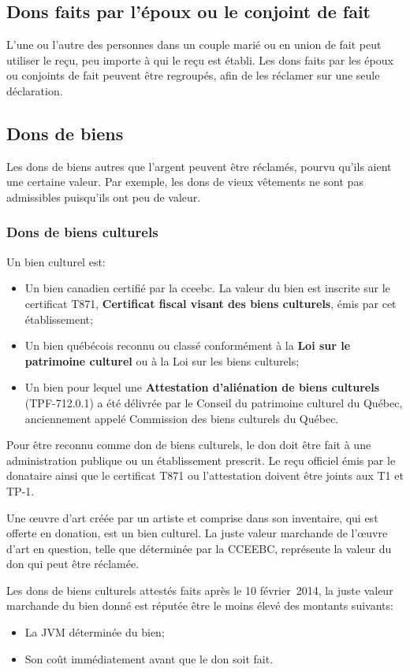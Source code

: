 \subsection{Dons faits par l'époux ou le conjoint de fait}
L'une ou l'autre des personnes dans un couple marié ou en union de fait peut utiliser le reçu, peu importe à qui le reçu est établi. Les dons faits par les époux ou conjoints de fait peuvent être regroupés, afin de les réclamer sur une seule déclaration.

\subsection{Dons de biens}
Les dons de biens autres que l'argent peuvent être réclamés, pourvu qu'ils aient une certaine valeur. Par exemple, les dons de vieux vêtements ne sont pas admissibles puisqu'ils ont peu de valeur. 

\subsubsection{Dons de biens culturels}
Un bien culturel est:
\begin{itemize}
	\item Un bien canadien certifié par la \acrfull{cceebc}. La valeur du bien est inscrite sur le certificat T871, \textbf{Certificat fiscal visant des biens culturels}, émis par cet établissement; 
	\item Un bien québécois reconnu ou classé conformément à la \textbf{Loi sur le patrimoine culturel} ou à la Loi sur les biens culturels;
	\item Un bien pour lequel une \textbf{Attestation d'aliénation de biens culturels} (TPF-712.0.1) a été délivrée par le Conseil du patrimoine culturel du Québec, anciennement appelé Commission des biens culturels du Québec.
\end{itemize}

Pour être reconnu comme don de biens culturels, le don doit être fait à une administration publique ou un établissement prescrit. Le reçu officiel émis par le donataire ainsi que le certificat T871 ou l'attestation doivent être joints aux T1 et TP-1.

Une œuvre d'art créée par un artiste et comprise dans son inventaire, qui est offerte en donation, est un bien culturel. La juste valeur marchande de l'œuvre d'art en question, telle que déterminée par la CCEEBC, représente la valeur du don qui peut être réclamée.

Les dons de biens culturels attestés faits après le 10 février~2014, la juste valeur marchande du bien donné est réputée être le moins élevé des montants suivants:
\begin{itemize}
	\item La JVM déterminée du bien;
	\item Son coût immédiatement avant que le don soit fait.
\end{itemize}

